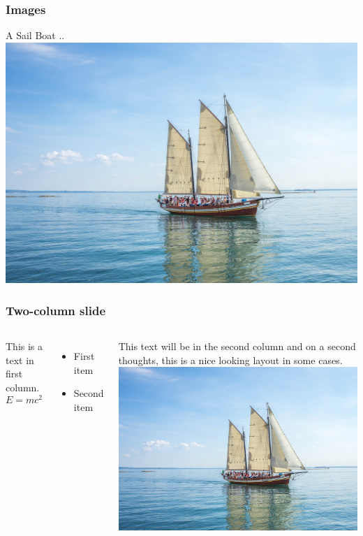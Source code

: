 \documentclass[12pt]{beamer}
\begin{document}
\begin{frame}
    \frametitle{Images}
    A Sail Boat ..
    \includegraphics[width=0.8\linewidth]{boat.jpg}
\end{frame}

\begin{frame}
    \frametitle{Two-column slide}
    \begin{columns}
        This is a text in first column.
        $$E=mc^2$$
        \begin{itemize}
        \item First item
        \item Second item
        \end{itemize}
        
        This text will be in the second column
        and on a second thoughts, this is a nice looking
        layout in some cases.
        \includegraphics[width=0.8\linewidth]{boat.jpg}
    \end{columns}
\end{frame}
\end{document}
